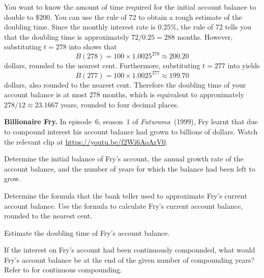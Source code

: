 \documentclass[a4paper,oneside,12pt]{article}
\begin{document}
{\begin{solution}
You want to know the amount of time required for the initial account
balance to double to $\$200$.  You can use the rule of $72$ to obtain
a rough estimate of the doubling time.  Since the monthly interest
rate is $0.25\%$, the rule of $72$ tells you that the doubling time is
approximately $72 / 0.25 = 288$ months.  However, substituting
$t = 278$ into 
shows that
\[
B(278)
=
100 \times 1.0025^{278}
\approx
200.20
\]
dollars, rounded to the nearest cent.  Furthermore, substituting
$t = 277$ into  yields
\[
B(277)
=
100 \times 1.0025^{277}
\approx
199.70
\]
dollars, also rounded to the nearest cent.  Therefore the doubling
time of your account balance is at most $278$ months, which is
equivalent to approximately $278 / 12 \approx 23.1667$ years, rounded
to four decimal places.
\end{solution}
}{}

\begin{exercise}
\textbf{Billionaire Fry.}
In episode~6, season~1 of \emph{Futurama}~(1999), Fry learnt that due
to compound interest his account balance had grown to billions of
dollars.  Watch the relevant clip at
\url{https://youtu.be/f2Wi6AoArV0}.
\begin{packedenum}
\item\label{subex:exponential:Fry_initial_balance}
  Determine the initial balance of Fry's account, the annual growth
  rate of the account balance, and the number of years for which the
  balance had been left to grow.

\item\label{subex:exponential:Fry_formula}
  Determine the formula that the bank teller used to approximate Fry's
  current account balance.  Use the formula to calculate Fry's current
  account balance, rounded to the nearest cent.

\item\label{subex:exponential:Fry_doubling_time}
  Estimate the doubling time of Fry's account balance.

\item\label{subex:exponential:Fry_continuous_compounding}
  If the interest on Fry's account had been continuously compounded,
  what would Fry's account balance be at the end of the given number
  of compounding years?  Refer to 
  for continuous compounding.
\end{packedenum}
\end{exercise}
\end{document}
